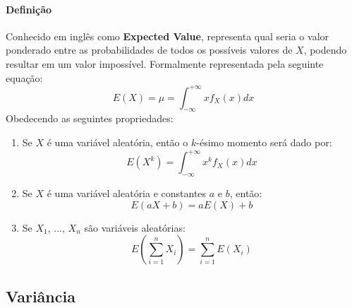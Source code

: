 \documentclass{article}
\begin{document}
            \paragraph{Definição}Conhecido em inglês como \textbf{Expected Value}, representa qual seria o valor ponderado entre as probabilidades de todos os possíveis valores de $X$, podendo resultar em um valor impossível. Formalmente representada pela seguinte equação:
                \begin{equation}
                    \boxed{
                        E(X) = \mu = 
                        \int_{-\infty}^{+\infty} x f_{X}(x) dx
                    }
                \end{equation}
            Obedecendo as seguintes propriedades:
                \begin{enumerate}[rightmargin = \leftmargin, noitemsep]
                    \item Se $X$ é uma variável aleatória, então o $k$-ésimo momento será dado por:
                        \begin{equation}
                            \boxed{
                                E(X^{k}) = 
                                \int_{-\infty}^{+\infty} x^{k} f_{X}(x) dx
                            }
                        \end{equation}
                    \item Se $X$ é uma variável aleatória e constantes $a$ e $b$, então:
                        \begin{equation}
                            \boxed{
                                E(a X + b) = a E(X) + b
                            }
                        \end{equation}
                    \item Se $X_{1}$, ..., $X_{n}$ são variáveis aleatórias:
                        \begin{equation}
                            \boxed{
                                E \left( \sum_{i=1}^{n} X_{i} \right) = \sum_{i=1}^{n} E(X_{i})
                            }
                        \end{equation}
                \end{enumerate}

        \subsection{Variância}
\end{document}
